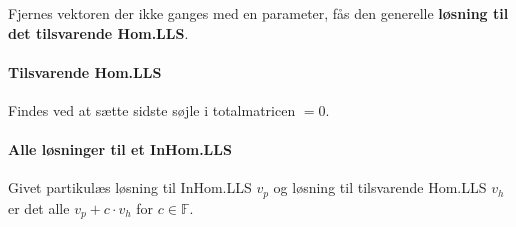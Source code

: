 Fjernes vektoren der ikke ganges med en parameter, fås den generelle \textbf{løsning til det tilsvarende Hom.LLS}.


\paragraph{Tilsvarende Hom.LLS}
Findes ved at sætte sidste søjle i totalmatricen $=0$.

\paragraph{Alle løsninger til et InHom.LLS}
Givet partikulæs løsning til InHom.LLS $v_p$ og løsning til tilsvarende Hom.LLS $v_h$ er det alle $v_p + c \cdot v_h$ for $c \in \mathbb{F}$.
